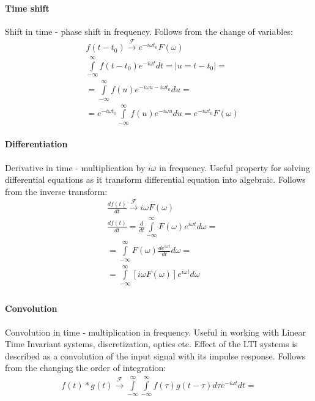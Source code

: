 \documentclass{article}
\begin{document}
\paragraph{Time shift} Shift in time - phase shift in frequency. Follows from the change of variables:
\begin{align*}
    &f(t - t_0) \xrightarrow{\mathcal{F}}  e^{-i\omega t_0} F({\omega})  \\
    &\int \limits^{\infty}_{-\infty} f(t - t_0) e^{-i\omega t}dt = \left| u=t - t_0 \right| = \\
    &=\int \limits^{\infty}_{-\infty} f(u) e^{-i\omega u - i \omega t_0}du = \\ 
    &=e^{- i \omega t_0}\int \limits^{\infty}_{-\infty} f(u) e^{-i\omega u }du =  e^{-i\omega t_0} F({\omega})
\end{align*}

\paragraph{Differentiation} Derivative in time - multiplication by $i \omega$ in frequency. 
Useful property for solving differential equations as it transform differential equation into algebraic.
 Follows from the inverse transform:
\begin{align*}
    & \frac{d f(t)}{dt} \xrightarrow{\mathcal{F}} i\omega F({\omega}) \\
    &\frac{d f(t)}{dt} = \frac{d }{dt} \int \limits^{\infty}_{-\infty} F(\omega) e^{i\omega t}d \omega = \\
    &=\int \limits^{\infty}_{-\infty}  F(\omega) \frac{d e^{i\omega t}}{dt} d \omega = \\
    &= \int \limits^{\infty}_{-\infty} \left[ i\omega F(\omega) \right] e^{i\omega t} d \omega \\
\end{align*}

\paragraph{Convolution} Convolution in time - multiplication in frequency. 
Useful in working with Linear Time Invariant systems, discretization, optics etc.
 Effect of the LTI systems is described as a convolution of the input signal with its impulse response.
 Follows from the changing the order of integration:
\begin{align*}
    f(t) * g(t) \xrightarrow{\mathcal{F}} \int \limits^{\infty}_{-\infty} \int \limits^{\infty}_{-\infty} f(\tau ) g(t - \tau) d \tau e^{-i\omega t}dt = 
\end{align*}
\end{document}
